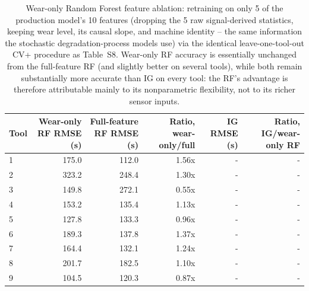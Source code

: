 \begin{table}[t]
\centering
\caption{Wear-only Random Forest feature ablation: retraining on only 5 of the production model's 10 features (dropping the 5 raw signal-derived statistics, keeping wear level, its causal slope, and machine identity -- the same information the stochastic degradation-process models use) via the identical leave-one-tool-out CV+ procedure as Table~S8. Wear-only RF accuracy is essentially unchanged from the full-feature RF (and slightly better on several tools), while both remain substantially more accurate than IG on every tool: the RF's advantage is therefore attributable mainly to its nonparametric flexibility, not to its richer sensor inputs.}
\label{tab:rf-feature-ablation}
\begin{tabular}{lrrrrr}
\toprule
Tool & Wear-only RF RMSE (s) & Full-feature RF RMSE (s) & Ratio, wear-only/full & IG RMSE (s) & Ratio, IG/wear-only RF \\
\midrule
1 & 175.0 & 112.0 & 1.56x & - & - \\
2 & 323.2 & 248.4 & 1.30x & - & - \\
3 & 149.8 & 272.1 & 0.55x & - & - \\
4 & 153.2 & 135.4 & 1.13x & - & - \\
5 & 127.8 & 133.3 & 0.96x & - & - \\
6 & 189.3 & 137.8 & 1.37x & - & - \\
7 & 164.4 & 132.1 & 1.24x & - & - \\
8 & 201.7 & 182.5 & 1.10x & - & - \\
9 & 104.5 & 120.3 & 0.87x & - & - \\
\bottomrule
\end{tabular}
\end{table}
